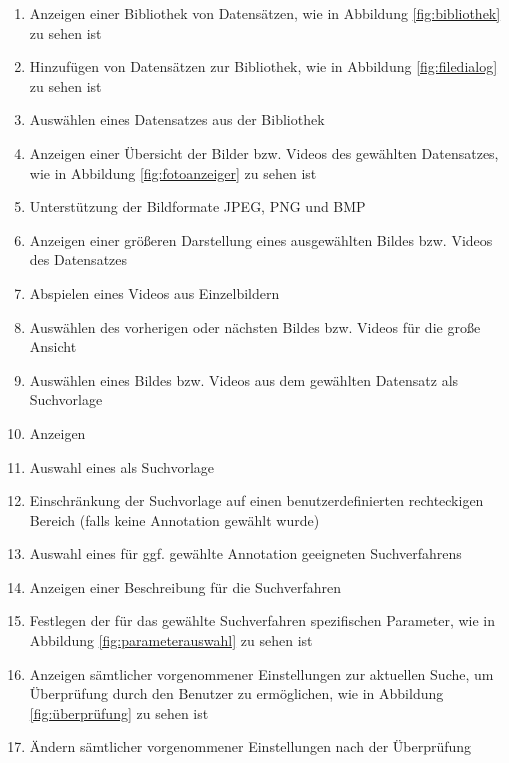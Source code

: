 \begin{enumerate} [label=\bfseries /F \arabic*0/, leftmargin=*]
	\item Anzeigen einer Bibliothek von Datensätzen, wie in Abbildung \ref{fig:bibliothek} zu sehen ist \label{f:bibliothek_anzeigen}
	\item Hinzufügen von Datensätzen zur Bibliothek, wie in Abbildung \ref{fig:filedialog} zu sehen ist \label{f:datensatz_hinzufuegen}
	\item Ausw\"ahlen eines Datensatzes aus der Bibliothek \label{f:auswahl_eines_datensatzes}
	\item Anzeigen einer Übersicht der Bilder bzw. Videos des gewählten Datensatzes, wie in Abbildung \ref{fig:fotoanzeiger} zu sehen ist \label{f:uebersicht_anzeigen}
	\item Unterstützung der Bildformate JPEG, PNG und BMP
	\item Anzeigen einer größeren Darstellung eines ausgewählten Bildes bzw. Videos des Datensatzes \label{f:anzeigen_groessere_darstellung}
	\item Abspielen eines Videos aus Einzelbildern \label{f:video_abspielen}
	\item Auswählen des vorherigen oder nächsten Bildes bzw. Videos für die große Ansicht \label{f:vorheriges_naechstes}
	\item Ausw\"ahlen eines Bildes bzw. Videos aus dem gewählten Datensatz als Suchvorlage \label{f:bildauswahl}
	\item Anzeigen  \label{f:annotation_anzeigen}
	\item Auswahl eines  als Suchvorlage \label{f:annotation_auswaehlen}
	\item Einschränkung der Suchvorlage auf einen benutzerdefinierten rechteckigen Bereich (falls keine \gls{Annotation} gewählt wurde) \label{f:bereich_auswaehlen}
	\item Auswahl eines für ggf. gewählte \gls{Annotation} geeigneten Suchverfahrens \label{f:auswahl_suchverfahren}
	\item Anzeigen einer Beschreibung für die Suchverfahren \label{f:beschreibung_suchverfahren}
	\item Festlegen der für das gewählte Suchverfahren spezifischen Parameter, wie in Abbildung \ref{fig:parameterauswahl} zu sehen ist \label{f:parameterwahl}
	\item Anzeigen sämtlicher vorgenommener Einstellungen zur aktuellen Suche, um Überprüfung durch den Benutzer zu ermöglichen, wie in Abbildung \ref{fig:überprüfung} zu sehen ist \label{f:ueberpruefung}
	\item Ändern sämtlicher vorgenommener Einstellungen nach der Überprüfung \label{f:einstellungen_nach_ueberpruefung_aendern}

\end{enumerate}
